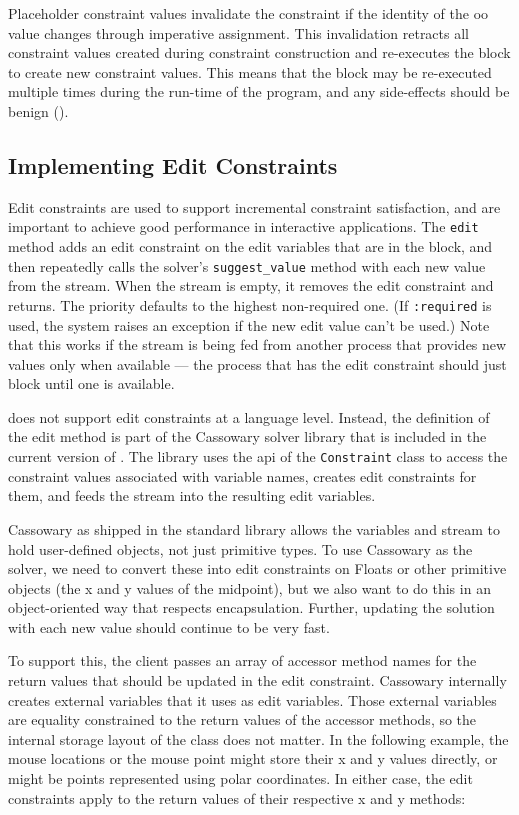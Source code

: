 Placeholder constraint values invalidate the constraint if the
identity of the \ac{oo} value changes through imperative
assignment. This invalidation retracts all constraint values created
during constraint construction and re-executes the block to create new
constraint values. This means that the block may be re-executed
multiple times during the run-time of the program, and any side-effects
should be benign ().

\subsection{Implementing Edit Constraints}
\label{sec:implementing-edit-constraints}

Edit constraints are used to support incremental constraint
satisfaction, and are important to achieve good performance in
interactive applications.  The \lstinline{edit} method adds an edit
constraint on the edit variables that are in the block, and then
repeatedly calls the solver's \lstinline{suggest_value} method with
each new value from the stream.  When the stream is empty, it removes
the edit constraint and returns.  The priority defaults to the
highest non-required one.  (If \lstinline{:required} is used,
the system raises an exception if the new edit value can't be used.)
Note that this works if the stream is being fed from another process
that provides new values only when available --- the process that has
the edit constraint should just block until one is available.

\langname does not support edit constraints at a language level.
Instead, the definition of the edit method is part of the Cassowary
solver library that is included in the current version of
\toolname. The library uses the \ac{api} of the \lstinline{Constraint}
class to access the constraint values associated with variable names,
creates edit constraints for them, and feeds the stream into the
resulting edit variables.

Cassowary as shipped in the \toolname standard library allows the
variables and stream to hold user-defined objects, not just primitive
types. To use Cassowary as the solver, we need to convert these into
edit constraints on Floats or other primitive objects (\eg the x and y
values of the midpoint), but we also want to do this in an
object-oriented way that respects encapsulation.  Further, updating
the solution with each new value should continue to be very fast.

To support this, the client passes an array of accessor method names
for the return values that should be updated in the edit
constraint. Cassowary internally creates external variables that it
uses as edit variables. Those external variables are equality
constrained to the return values of the accessor methods, so the
internal storage layout of the class does not matter. In the following
example, the mouse locations or the mouse point might store their x
and y values directly, or might be points represented using polar
coordinates.  In either case, the edit constraints apply to the return
values of their respective x and y methods:


